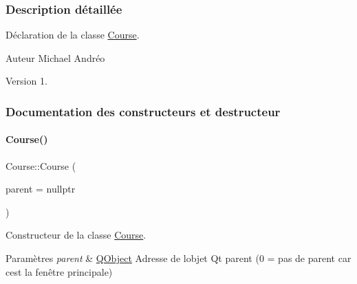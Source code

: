 \subsubsection{Description détaillée}
Déclaration de la classe \hyperlink{class_course}{Course}. 

\begin{DoxyAuthor}{Auteur}
Michael Andréo 
\end{DoxyAuthor}
\begin{DoxyVersion}{Version}
1. 
\end{DoxyVersion}


\subsubsection{Documentation des constructeurs et destructeur}
\mbox{\label{class_course_af6317ecab95f8a2eb205b4f91b530992}} 
\paragraph{\texorpdfstring{Course()}{Course()}}
{\footnotesize\ttfamily Course\+::\+Course (\begin{DoxyParamCaption}\item[{\hyperlink{class_q_object}{Q\+Object} $\ast$}]{parent = {\ttfamily nullptr} }\end{DoxyParamCaption})}



Constructeur de la classe \hyperlink{class_course}{Course}. 


\begin{DoxyParams}{Paramètres}
{\em parent} & \hyperlink{class_q_object}{Q\+Object} Adresse de l\textquotesingle{}objet Qt parent (0 = pas de parent car c\textquotesingle{}est la fenêtre principale) \\
\hline
\end{DoxyParams}



